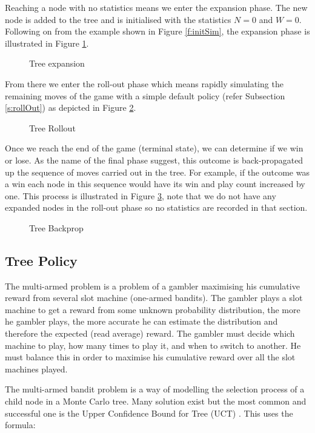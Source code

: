 \documentclass{bhamthesis}
\theoremstyle{definition}
\begin{document}
Reaching a node with no statistics means we enter the expansion phase. The new node is added to the tree and is initialised with the statistics $N=0$ and $W=0$. Following on from the example shown in Figure \ref{f:initSim}, the expansion phase is illustrated in Figure \ref{f:treeExpansion}.
\begin{figure}
	
	\caption{Tree expansion}\label{f:treeExpansion}
\end{figure}
From there we enter the roll-out phase which means rapidly simulating the remaining moves of the game with a simple default policy (refer Subsection \ref{s:rollOut}) as depicted in Figure \ref{f:treeRollout}.
\begin{figure}
	
	\caption{Tree Rollout}\label{f:treeRollout}
\end{figure} 
Once we reach the end of the game (terminal state), we can determine if we win or lose. As the name of the final phase suggest, this outcome is back-propagated up the sequence of moves carried out in the tree. For example, if the outcome was a win each node in this sequence would have its win and play count increased by one. This process is illustrated in Figure \ref{f:treeBackprop}, note that we do not have any expanded nodes in the roll-out phase so no statistics are recorded in that section.

\begin{figure}
	
	\caption{Tree Backprop}\label{f:treeBackprop}
\end{figure}

\subsection{Tree Policy}\label{s:tPolicy}
The multi-armed problem is a problem of a gambler maximising his cumulative reward from several slot machine (one-armed bandits). The gambler plays a slot machine to get a reward from some unknown probability distribution, the more he gambler plays, the more accurate he can estimate the distribution and therefore the expected (read average) reward. The gambler must decide which machine to play, how many times to play it, and when to switch to another. He must balance this in order to maximise his cumulative reward over all the slot machines played. 

The multi-armed bandit problem is a way of modelling the selection process of a child node in a Monte Carlo tree. Many solution exist but the most common and successful one is the Upper Confidence Bound for Tree (UCT) \cite{Browne2012}. This uses the formula:
\end{document}

